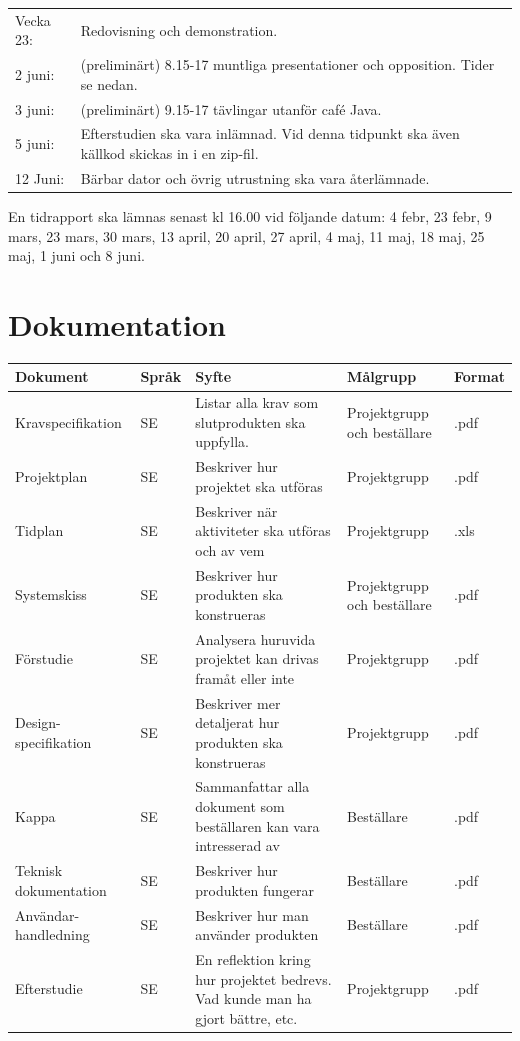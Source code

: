 \documentclass[11pt]{article}
\begin{document}
\begin{flushleft}
\begin{center}
\begin{longtable}{l p{.8\linewidth} }
Vecka 23: &
Redovisning och demonstration.\\

2 juni: &
(preliminärt) 8.15-17 muntliga presentationer och opposition. Tider se nedan. \\

3 juni: &
(preliminärt) 9.15-17 tävlingar utanför café Java. \\

5 juni: &
Efterstudien ska vara inlämnad. Vid denna tidpunkt ska även källkod skickas in i en zip-fil. \\

12 Juni: &
Bärbar dator och övrig utrustning ska vara återlämnade.
\end{longtable}
\end{center}
En tidrapport ska lämnas senast kl 16.00 vid följande datum: 4 febr, 23 febr, 9 mars, 23 mars, 30 mars, 13 april, 20 april, 27 april, 4 maj, 11 maj, 18 maj, 25 maj, 1 juni och 8 juni.

\section{Dokumentation}

\begin{center}
\begin{longtable}{|p{.24\linewidth}|p{.08\linewidth}|p{.25\linewidth}|p{.19\linewidth}|p{.1\linewidth}|}\hline
\textbf{Dokument} & \textbf{Språk} & \textbf{Syfte} & \textbf{Målgrupp} & \textbf{Format} \\ \hline

Kravspecifikation & SE & Listar alla krav som slutprodukten ska uppfylla. & Projektgrupp och beställare & .pdf \\ \hline
Projektplan & SE & Beskriver hur projektet ska utföras & Projektgrupp & .pdf \\ \hline
Tidplan & SE & Beskriver när aktiviteter ska utföras och av vem & Projektgrupp & .xls \\ \hline
Systemskiss & SE & Beskriver hur produkten ska konstrueras& Projektgrupp och beställare & .pdf \\ \hline
Förstudie & SE & Analysera huruvida projektet kan drivas framåt eller inte & Projektgrupp & .pdf \\ \hline
Design-specifikation & SE & Beskriver mer detaljerat hur produkten ska konstrueras & Projektgrupp & .pdf \\ \hline
Kappa & SE & Sammanfattar alla dokument som beställaren kan vara intresserad av & Beställare & .pdf \\ \hline
Teknisk dokumentation & SE & Beskriver hur produkten fungerar & Beställare & .pdf \\ \hline
Användar-handledning & SE & Beskriver hur man använder produkten& Beställare & .pdf \\ \hline
Efterstudie & SE & En reflektion kring hur projektet bedrevs. Vad kunde man ha gjort bättre, etc.& Projektgrupp & .pdf \\ \hline


\end{longtable}
\end{center}
\end{flushleft}
\end{document}
